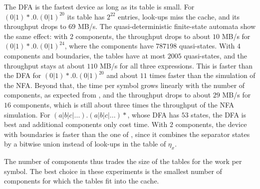 The DFA is the fastest device as long as its table is small. For $(0|1)*.0.(0|1)^{20}$ its
table has $2^{22}$ entries, look-ups miss the cache, and its throughput drops to $69$ MB/s.
The quasi-deterministic finite-state automata show the same effect: with $2$ components,
the throughput drops to about $10$ MB/s for $(0|1)*.0.(0|1)^{24}$, where the components have
$787198$ quasi-states. With $4$ components and boundaries, the tables have at most $2005$
quasi-states, and the throughput stays at about $110$ MB/s for all three expressions. This
is faster than the DFA for $(0|1)*.0.(0|1)^{20}$ and about $11$ times faster than the
simulation of the NFA. Beyond that, the time per symbol grows linearly with the number of
components, as expected from , and the throughput drops to about
$29$ MB/s for $16$ components, which is still about three times the throughput of the NFA
simulation. For $(a|b|c|...).(a|b|c|...)*$, whose DFA has $53$ states, the DFA is best and
additional components only cost time. With $2$ components, the device with boundaries is
faster than the one of , since it combines the
separator states by a bitwise union instead of look-ups in the table of $\eta_x$.

The number of components thus trades the size of the tables for the work per symbol. The
best choice in these experiments is the smallest number of components for which the tables
fit into the cache.
